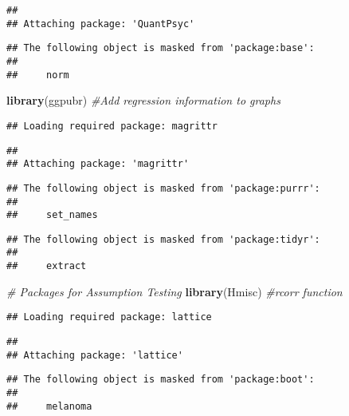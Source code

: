 \documentclass[]{article}
\newenvironment{Shaded}{\begin{snugshade}}{\end{snugshade}}
\newcommand{\CommentTok}[1]{\textcolor[rgb]{0.56,0.35,0.01}{\textit{#1}}}
\newcommand{\KeywordTok}[1]{\textcolor[rgb]{0.13,0.29,0.53}{\textbf{#1}}}
\newcommand{\NormalTok}[1]{#1}
\begin{document}
\begin{verbatim}
## 
## Attaching package: 'QuantPsyc'
\end{verbatim}

\begin{verbatim}
## The following object is masked from 'package:base':
## 
##     norm
\end{verbatim}

\begin{Shaded}
\begin{Highlighting}[]
\KeywordTok{library}\NormalTok{(ggpubr)     }\CommentTok{#Add regression information to graphs}
\end{Highlighting}
\end{Shaded}

\begin{verbatim}
## Loading required package: magrittr
\end{verbatim}

\begin{verbatim}
## 
## Attaching package: 'magrittr'
\end{verbatim}

\begin{verbatim}
## The following object is masked from 'package:purrr':
## 
##     set_names
\end{verbatim}

\begin{verbatim}
## The following object is masked from 'package:tidyr':
## 
##     extract
\end{verbatim}

\begin{Shaded}
\begin{Highlighting}[]
\CommentTok{# Packages for Assumption Testing}
\KeywordTok{library}\NormalTok{(Hmisc)      }\CommentTok{#rcorr function}
\end{Highlighting}
\end{Shaded}

\begin{verbatim}
## Loading required package: lattice
\end{verbatim}

\begin{verbatim}
## 
## Attaching package: 'lattice'
\end{verbatim}

\begin{verbatim}
## The following object is masked from 'package:boot':
## 
##     melanoma
\end{verbatim}
\end{document}
